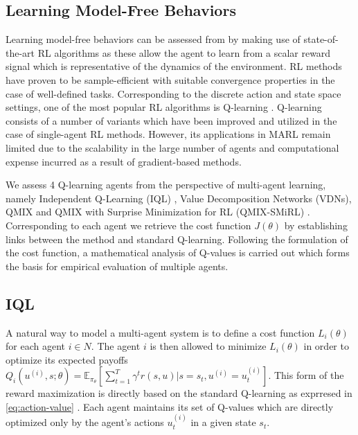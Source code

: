 \documentclass{article}
\begin{document}
\begin{multicols}{2}
\subsection{Learning Model-Free Behaviors}
Learning model-free behaviors can be assessed from by making use of state-of-the-art RL algorithms as these allow the agent to learn from a scalar reward signal which is representative of the dynamics of the environment. RL methods have proven to be sample-efficient \cite{atari} with suitable convergence properties \cite{rl} in the case of well-defined tasks. Corresponding to the discrete action and state space settings, one of the most popular RL algorithms is Q-learning \cite{rl}. Q-learning consists of a number of variants which have been improved and utilized in the case of single-agent RL methods. However, its applications in MARL remain limited due to the scalability in the large number of agents \cite{qmix} and computational expense incurred as a result of gradient-based methods. 

We assess 4 Q-learning agents from the perspective of multi-agent learning, namely Independent Q-Learning (IQL) \cite{iql}, Value Decomposition Networks (VDNs), QMIX \cite{qmix} and QMIX with Surprise Minimization for RL (QMIX-SMiRL) \cite{smirl}. Corresponding to each agent we retrieve the cost function $J(\theta)$ by establishing links between the method and standard Q-learning. Following the formulation of the cost function, a mathematical analysis of Q-values is carried out which forms the basis for empirical evaluation of multiple agents. 

\subsection{IQL}
A natural way to model a multi-agent system is to define a cost function $L_{i}(\theta)$ for each agent $i \in N$. The agent $i$ is then allowed to minimize $L_{i}(\theta)$ in order to optimize its expected payoffs $Q_{i}(u^{(i)},s;\theta) = \mathbb{E}_{\pi_{\theta}}[\sum_{t=1}^{T}\gamma^{t}r(s,u)|s=s_{t},u^{(i)}=u^{(i)}_{t}]$. This form of the reward maximization is directly based on the standard Q-learning as exprresed in \autoref{eq:action-value} \cite{iql}. Each agent maintains its set of Q-values which are directly optimized only by the agent's actions $u^{(i)}_{t}$ in a given state $s_{t}$. 


\end{multicols}
\end{document}
